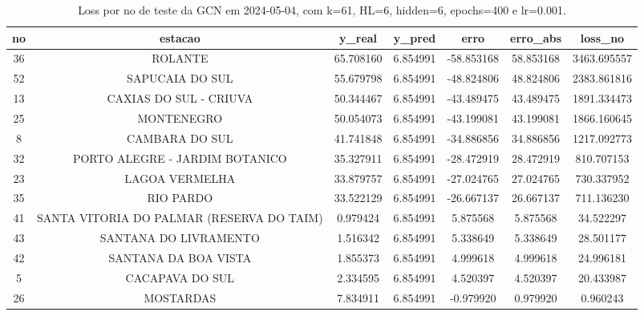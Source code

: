 \begin{table}[h]
\centering
\caption{Loss por no de teste da GCN em 2024-05-04, com k=61, HL=6, hidden=6, epochs=400 e lr=0.001.}
\label{tab:gcn_loss_k61_hl6_h6_e400_d20240504}
\begin{tabular}{ccccccc}
\toprule
no & estacao & y\_real & y\_pred & erro & erro\_abs & loss\_no \\
\midrule
36 & ROLANTE & 65.708160 & 6.854991 & -58.853168 & 58.853168 & 3463.695557 \\
52 & SAPUCAIA DO SUL & 55.679798 & 6.854991 & -48.824806 & 48.824806 & 2383.861816 \\
13 & CAXIAS DO SUL - CRIUVA & 50.344467 & 6.854991 & -43.489475 & 43.489475 & 1891.334473 \\
25 & MONTENEGRO & 50.054073 & 6.854991 & -43.199081 & 43.199081 & 1866.160645 \\
8 & CAMBARA DO SUL & 41.741848 & 6.854991 & -34.886856 & 34.886856 & 1217.092773 \\
32 & PORTO ALEGRE - JARDIM BOTANICO & 35.327911 & 6.854991 & -28.472919 & 28.472919 & 810.707153 \\
23 & LAGOA VERMELHA & 33.879757 & 6.854991 & -27.024765 & 27.024765 & 730.337952 \\
35 & RIO PARDO & 33.522129 & 6.854991 & -26.667137 & 26.667137 & 711.136230 \\
41 & SANTA VITORIA DO PALMAR (RESERVA DO TAIM) & 0.979424 & 6.854991 & 5.875568 & 5.875568 & 34.522297 \\
43 & SANTANA DO LIVRAMENTO & 1.516342 & 6.854991 & 5.338649 & 5.338649 & 28.501177 \\
42 & SANTANA DA BOA VISTA & 1.855373 & 6.854991 & 4.999618 & 4.999618 & 24.996181 \\
5 & CACAPAVA DO SUL & 2.334595 & 6.854991 & 4.520397 & 4.520397 & 20.433987 \\
26 & MOSTARDAS & 7.834911 & 6.854991 & -0.979920 & 0.979920 & 0.960243 \\
\bottomrule
\end{tabular}
\end{table}
